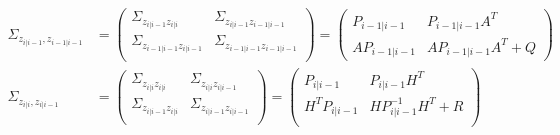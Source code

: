 \documentclass[12pt]{article}
\begin{document}
\begin{align}
    \Sigma_{z_{i|i-1},z_{i-1|i-1}} & = \begin{pmatrix}
        \Sigma_{z_{i|i-1}z_{i|i}} & \Sigma_{z_{i|i-1}z_{i-1|i-1}} \\
        \Sigma_{z_{i-1|i-1}z_{i|i-1}} & \Sigma_{z_{i-1|i-1}z_{i-1|i-1}} \\
    \end{pmatrix} 
    = \begin{pmatrix}
        P_{i-1|i-1} & P_{i-1|i-1} A^T \\
        A P_{i-1|i-1} & A P_{i-1|i-1} A^T + Q
    \end{pmatrix} \\
    \Sigma_{z_{i|i},z_{i|i-1}} & = \begin{pmatrix}
        \Sigma_{z_{i|i}z_{i|i}} & \Sigma_{z_{i|i}z_{i|i-1}} \\
        \Sigma_{z_{i|i-1}z_{i|i}} & \Sigma_{z_{i|i-1}z_{i|i-1}} \\
    \end{pmatrix} 
    = \begin{pmatrix}
        P_{i|i-1} & P_{i|i-1}H^T \\
        H^TP_{i|i-1} & HP_{i|i-1}^{-1}H^T+R \\
    \end{pmatrix} 
\end{align}
\end{document}
